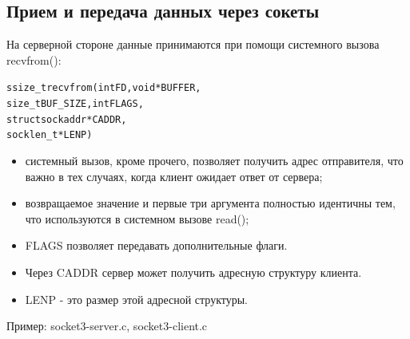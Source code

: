 \documentclass{beamer}
\begin{document}
\subsection{Прием и передача данных через сокеты}
\begin{frame}[fragile]
	На серверной стороне данные принимаются при помощи системного вызова recvfrom():
	\begin{alltt}
        ssize_t recvfrom (int FD, void * BUFFER,
                          size_t BUF_SIZE, int FLAGS,
                          struct sockaddr * CADDR,
                          socklen_t * LENP)
	\end{alltt}
	\begin{itemize}
		\item системный вызов, кроме прочего, позволяет получить адрес отправителя, что важно в тех случаях, когда клиент ожидает ответ от сервера;
		\item возвращаемое значение и первые три аргумента полностью идентичны тем, что используются в системном вызове read();
		\item FLAGS позволяет передавать дополнительные флаги. 
		\item Через CADDR сервер может получить адресную структуру клиента. 
		\item LENP - это размер этой адресной структуры.
	\end{itemize}
	Пример: socket3-server.c, socket3-client.c
\end{frame}
\end{document}
